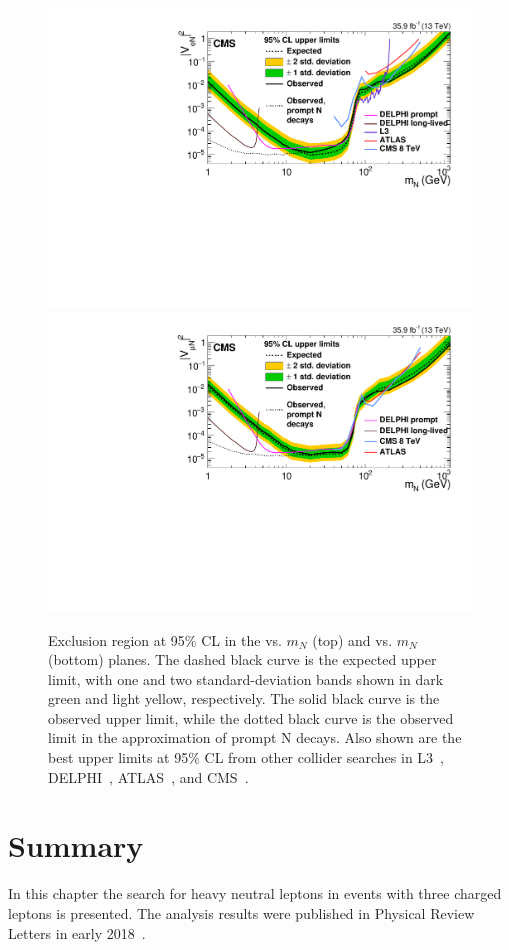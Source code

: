 \begin{figure}[h]
\centering
\includegraphics[width=.80\textwidth]{Figures/c5/limits/CMS-EXO-17-012_Figure_002-a.pdf}\\
\includegraphics[width=.80\textwidth]{Figures/c5/limits/CMS-EXO-17-012_Figure_002-b.pdf}
\caption{Exclusion region at 95$\%$ CL in the \mixpare vs. $m_N$ (top) and \mixparm vs. $m_N$ (bottom) planes.
The dashed black curve is the expected upper limit, with one and two standard-deviation
bands shown in dark green and light yellow, respectively. The solid black curve is the observed
upper limit, while the dotted black curve is the observed limit in the approximation of
prompt N decays. Also shown are the best upper limits at 95$\%$ CL from other collider searches
in L3~\cite{ACHARD200167}, DELPHI~\cite{Abreu:1996pa}, ATLAS~\cite{Aad_2015}, and CMS~\cite{Sirunyan:2018xiv}. \willem}
\label{fig:limits}
\end{figure}

\clearpage
\section{Summary}
In this chapter the search for heavy neutral leptons in events with three
charged leptons is presented. The analysis
results were published in Physical Review Letters in early 2018~\cite{Sirunyan:2018mtv}.

